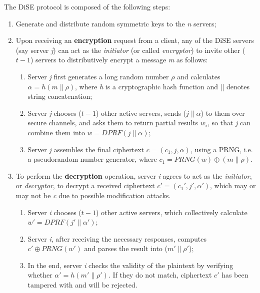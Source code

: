 \documentclass[runningheads]{llncs}
\begin{document}
The DiSE protocol is composed of the following steps:
\begin{enumerate}
    \item Generate and distribute random symmetric keys to the \textit{n} servers;
    \item Upon receiving an \textbf{encryption} request from a client, any of the DiSE servers (say server \textit{j}) can act as the \textit{initiator} (or called \textit{encryptor}) to invite other ($t - 1$) servers to distributively encrypt a message \textit{m} as follows:

    \begin{enumerate}
        \item Server \textit{j} first generates a long random number $\rho$ and calculates $\alpha = h(m \| \rho)$, where \textit{h} is a cryptographic hash function and || denotes string concatenation;
        \item  Server \textit{j} chooses ($t - 1$) other active servers, sends ($j \| \alpha$) to them over secure channels, and asks them to return partial results $w_i$, so that \textit{j} can combine them into $w = DPRF(j \| \alpha)$;
        \item Server \textit{j} assembles the final ciphertext $c = (c_1, j, \alpha)$, using a PRNG, i.e. a pseudorandom number generator, where $c_1 = PRNG(w) \oplus (m \| \rho)$.
    \end{enumerate}
    
    \item To perform the \textbf{decryption} operation, server \textit{i} agrees to act as the \textit{initiator}, or \textit{decryptor}, to decrypt a received ciphertext $c' = (c_1', j', \alpha')$, which may or may not be \textit{c} due to possible modification attacks.

    \begin{enumerate}
        \item Server \textit{i} chooses ($t - 1$) other active servers, which collectively calculate $w' = DPRF(j' \| \alpha')$;
        \item Server \textit{i}, after receiving the necessary responses, computes $c' \oplus PRNG(w')$ and parses the result into ($m' \| \rho'$);
        \item In the end, server \textit{i} checks the validity of the plaintext by verifying whether $\alpha' = h(m' \| \rho')$. If they do not match, ciphertext $c'$ has been tampered with and will be rejected.
    \end{enumerate}
\end{enumerate}
\end{document}
